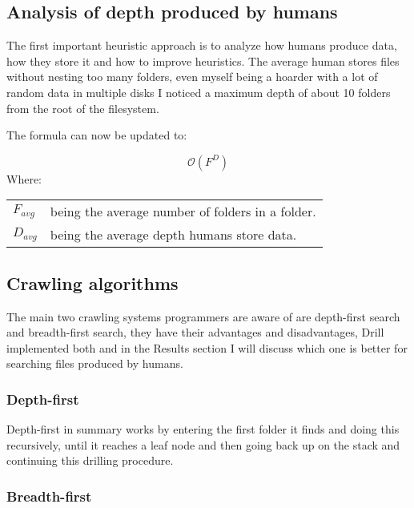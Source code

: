 \documentclass[12pt]{article}
\makeatletter
\newenvironment{conditions}
  {\par\vspace{\abovedisplayskip}\noindent\begin{tabular}{>{$}l<{$} @{${}={}$} l}}
  {\end{tabular}\par\vspace{\belowdisplayskip}}
\newcommand{\bigO}{\mathcal{O}}
\makeatother
\begin{document}
\subsection{Analysis of depth produced by humans}

The first important heuristic approach is to analyze how humans produce data, how they store it and how to improve heuristics.
The average human stores files without nesting too many folders, even myself being a hoarder with a lot of random data in multiple disks I noticed a maximum depth of about 10 folders from the root of the filesystem.


The formula can now be updated to:

\begin{equation}
    \label{equation_depth_analysis}
    \bigO(F^D)
\end{equation}
Where:
\begin{conditions}
    F_{avg} & being the average number of folders in a folder. \\
    D_{avg} & being the average depth humans store data.
\end{conditions}


\subsection{Crawling algorithms}

The main two crawling systems programmers are aware of are depth-first search and breadth-first search, they have their advantages and disadvantages, Drill implemented both and in the Results section I will discuss which one is better for searching files produced by humans.


\subsubsection{Depth-first}

Depth-first in summary works by entering the first folder it finds and doing this recursively, until it reaches a leaf node and then going back up on the stack and continuing this drilling procedure.


\subsubsection{Breadth-first}
\end{document}
